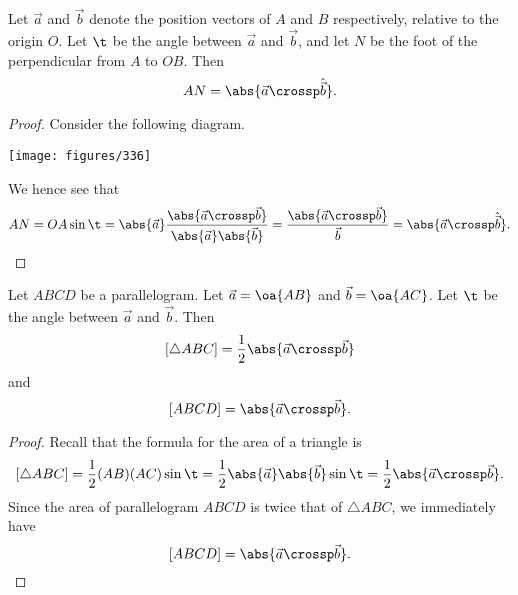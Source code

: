 \begin{proposition}
    Let $\vec a$ and $\vec b$ denote the position vectors of $A$ and $B$ respectively, relative to the origin $O$. Let $\t$ be the angle between $\vec a$ and $\vec b$, and let $N$ be the foot of the perpendicular from $A$ to $OB$. Then \[AN = \abs{\vec a \crossp \hat{\vec b}}.\]
\end{proposition}
\begin{proof}
    Consider the following diagram.
    \begin{center}
        \texttt{[image: figures/336]}
    \end{center}
    We hence see that \[AN = OA \sin \t = \abs{\vec a} \frac{\abs{\vec a \crossp \vec b}}{\abs{\vec a}\abs{\vec b}} = \frac{\abs{\vec a \crossp \vec b}}{\vec b} = \abs{\vec a \crossp \hat{\vec b}}.\]
\end{proof}

\begin{proposition}
    Let $ABCD$ be a parallelogram. Let $\vec a = \oa{AB}$ and $\vec b = \oa{AC}$. Let $\t$ be the angle between $\vec a$ and $\vec b$. Then \[[\triangle ABC] = \frac12 \abs{\vec a \crossp \vec b}\] and \[[ABCD] = \abs{\vec a \crossp \vec b}.\]
\end{proposition}
\begin{proof}
    Recall that the formula for the area of a triangle is \[[\triangle ABC] = \frac12 (AB)(AC) \sin \t = \frac12 \abs{\vec a} \abs{\vec b} \sin \t = \frac12 \abs{\vec a \crossp \vec b}.\] Since the area of parallelogram $ABCD$ is twice that of $\triangle ABC$, we immediately have \[[ABCD] = \abs{\vec a \crossp \vec b}.\]
\end{proof}